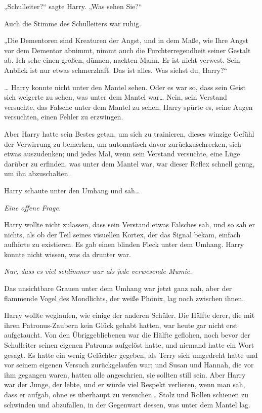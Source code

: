{„Schulleiter?“ sagte Harry. „Was sehen Sie?“

Auch die Stimme des Schulleiters war ruhig.

„Die Dementoren sind Kreaturen der Angst, und in dem Maße, wie Ihre Angst vor dem Dementor abnimmt, nimmt auch die Furchterregendheit seiner Gestalt ab. Ich sehe einen großen, dünnen, nackten Mann. Er ist nicht verwest. Sein Anblick ist nur etwas schmerzhaft. Das ist alles. Was siehst du, Harry?“

… Harry konnte nicht unter den Mantel sehen. Oder es war so, dass sein Geist sich weigerte zu sehen, was unter dem Mantel war… Nein, sein Verstand versuchte, das Falsche unter dem Mantel zu sehen, Harry spürte es, seine Augen versuchten, einen Fehler zu erzwingen.

Aber Harry hatte sein Bestes getan, um sich zu trainieren, dieses winzige Gefühl der Verwirrung zu bemerken, um automatisch davor zurückzuschrecken, sich etwas auszudenken; und jedes Mal, wenn sein Verstand versuchte, eine Lüge darüber zu erfinden, was unter dem Mantel war, war dieser Reflex schnell genug, um ihn abzuschalten.

Harry schaute unter den Umhang und sah…

\emph{Eine offene Frage.}

Harry wollte nicht zulassen, dass sein Verstand etwas Falsches sah, und so sah er nichts, als ob der Teil seines visuellen Kortex, der das Signal bekam, einfach aufhörte zu existieren. Es gab einen blinden Fleck unter dem Umhang. Harry konnte nicht wissen, was da drunter war.

\emph{Nur, dass es viel schlimmer war als jede verwesende Mumie.}

Das unsichtbare Grauen unter dem Umhang war jetzt ganz nah, aber der flammende Vogel des Mondlichts, der weiße Phönix, lag noch zwischen ihnen.

Harry wollte weglaufen, wie einige der anderen Schüler. Die Hälfte derer, die mit ihren Patronus-Zaubern kein Glück gehabt hatten, war heute gar nicht erst aufgetaucht. Von den Übriggebliebenen war die Hälfte geflohen, noch bevor der Schulleiter seinen eigenen Patronus aufgelöst hatte, und niemand hatte ein Wort gesagt. Es hatte ein wenig Gelächter gegeben, als Terry sich umgedreht hatte und vor seinem eigenen Versuch zurückgelaufen war; und Susan und Hannah, die vor ihm gegangen waren, hatten alle angeschrien, sie sollten still sein. Aber Harry war der Junge, der lebte, und er würde viel Respekt verlieren, wenn man sah, dass er aufgab, ohne es überhaupt zu versuchen… Stolz und Rollen schienen zu schwinden und abzufallen, in der Gegenwart dessen, was unter dem Mantel lag.

}
